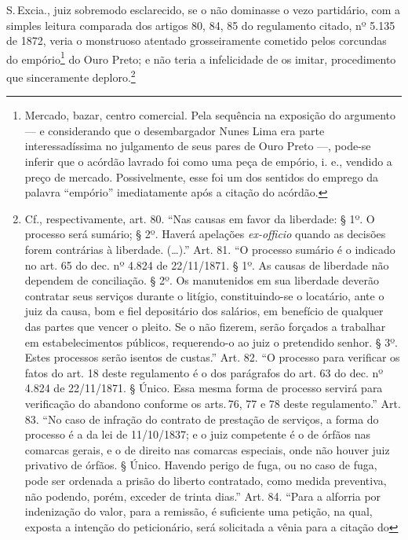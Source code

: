 S.\,Excia., juiz sobremodo esclarecido, se o não dominasse o vezo
partidário, com a simples leitura comparada dos artigos 80, 84, 85 do
regulamento citado, nº 5.135 de 1872, veria o monstruoso atentado
grosseiramente cometido pelos corcundas do empório\footnote{Mercado,
  bazar, centro comercial. Pela sequência na exposição do argumento --- e
  considerando que o desembargador Nunes Lima era parte interessadíssima no
  julgamento de seus pares de Ouro Preto ---, pode-se inferir que o
  acórdão lavrado foi como uma peça de empório, i. e., vendido a preço
  de mercado. Possivelmente, esse foi um dos sentidos do emprego da
  palavra ``empório'' imediatamente após a citação do acórdão.} do Ouro
Preto; e não teria a infelicidade de os imitar, procedimento que
sinceramente deploro.\footnote{Cf., respectivamente, art. 80. ``Nas
  causas em favor da liberdade: § 1º. O processo será sumário; § 2º.
  Haverá apelações \emph{ex-officio} quando as decisões forem contrárias
  à liberdade. (\ldots{}).'' Art. 81. ``O processo sumário é o indicado no art.
  65 do dec. nº 4.824 de 22/11/1871. § 1º. As causas de liberdade não
  dependem de conciliação. § 2º. Os manutenidos em sua liberdade deverão
  contratar seus serviços durante o litígio, constituindo-se o
  locatário, ante o juiz da causa, bom e fiel depositário dos salários,
  em benefício de qualquer das partes que vencer o pleito. Se o não
  fizerem, serão forçados a trabalhar em estabelecimentos públicos,
  requerendo-o ao juiz o pretendido senhor. § 3º. Estes processos serão
  isentos de custas.'' Art. 82. ``O processo para verificar os fatos do art.
  18 deste regulamento é o dos parágrafos do art. 63 do dec. nº 4.824 de
  22/11/1871. § Único. Essa mesma forma de processo servirá para
  verificação do abandono conforme os arts.\,76, 77 e 78 deste
  regulamento.'' Art. 83. ``No caso de infração do contrato de prestação de
  serviços, a forma do processo é a da lei de 11/10/1837; e o juiz
  competente é o de órfãos nas comarcas gerais, e o de direito nas
  comarcas especiais, onde não houver juiz privativo de órfãos. § Único.
  Havendo perigo de fuga, ou no caso de fuga, pode ser ordenada a prisão
  do liberto contratado, como medida preventiva, não podendo, porém,
  exceder de trinta dias.'' Art. 84. ``Para a alforria por indenização do
  valor, para a remissão, é suficiente uma petição, na qual, exposta a
  intenção do peticionário, será solicitada a vênia para a citação do
}
